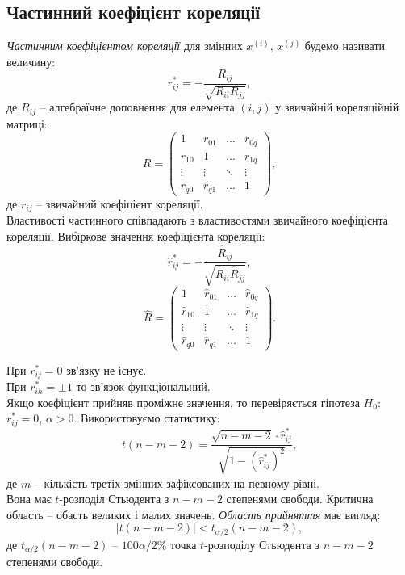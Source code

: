 \subsection{Частинний коефіцієнт кореляції}

\textit{Частинним коефіцієнтом кореляції} для змінних $x^{(i)}$, $x^{(j)}$ будемо називати величину: \[r_{ij}^* = - \dfrac{R_{ij}}{\sqrt{R_{ii}R_{jj}}},\] де $R_{ij}$ -- алгебраїчне доповнення для елемента $(i, j)$ у звичайній кореляційній матриці: \[ R = \begin{pmatrix} 1 & r_{01} & \ldots & r_{0q} \\ r_{10} & 1 & \ldots & r_{1q} \\ \vdots & \vdots & \ddots & \vdots \\ r_{q0} & r_{q1} & \ldots & 1 \end{pmatrix}, \] де $r_{ij}$ -- звичайний коефіцієнт кореляції. \\

Властивості частинного співпадають з властивостями звичайного коефіцієнта кореляції. Вибіркове значення коефіцієнта кореляції: \[\widehat{r}_{ij}^* = - \dfrac{\widehat{R}_{ij}}{\sqrt{\widehat{R}_{ii}\widehat{R}_{jj}}},\] \[ \widehat{R} = \begin{pmatrix} 1 & \widehat{r}_{01} & \ldots & \widehat{r}_{0q} \\ \widehat{r}_{10} & 1 & \ldots & \widehat{r}_{1q} \\ \vdots & \vdots & \ddots & \vdots \\ \widehat{r}_{q0} & \widehat{r}_{q1} & \ldots & 1 \end{pmatrix}. \]

При $r_{ij}^* = 0$ зв'язку не існує. \\

При $r_{ih}^* = \pm1$ то зв'язок функціональний. \\

Якщо коефіцієнт прийняв проміжне значення, то перевіряється гіпотеза $H_0$: $r_{ij}^*=0$, $\alpha>0$.  Використовуємо статистику: \[t(n - m - 2) = \dfrac{\sqrt{n - m - 2}\cdot \widehat{r}_{ij}^*}{\sqrt{1 - (\widehat{r}_{ij}^*)^2}},\] де $m$ -- кількість третіх змінних зафіксованих на певному рівні. \\

Вона має $t$-розподіл Стьюдента з $n - m - 2$ степенями свободи. Критична область -- обасть великих і малих значень. \textit{Область прийняття} має вигляд: \[|t(n - m - 2)| < t_{\alpha/2}(n - m - 2),\] де $t_{\alpha/2}(n - m - 2)$ -- $100\alpha/2\%$ точка $t$-розподілу Стьюдента з $n - m - 2$ степенями свободи.

